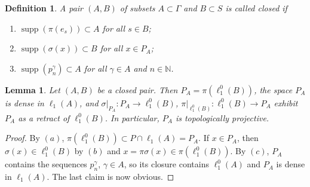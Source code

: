 \documentclass[12pt]{article}
\newtheorem{lemma}[theorem]{Lemma}
\newtheorem{definition}[theorem]{Definition}
\newcommand{\lo}[1]{\ell_1^0(#1)}
\newcommand{\ellone}[1]{\ell_1(#1)}
\newcommand{\supp}{\operatorname{supp}}
\begin{document}
\begin{definition}\label{ClosedPair} A pair $(A,B)$ of subsets $A\subset\Gamma$
    and $B\subset S$ is called closed if
    \begin{enumerate}[label = (\alph*)]
        \item $\supp(\pi(e_s))\subset A$ for all $s\in B$;
        \item $\supp(\sigma(x))\subset B$ for all $x\in P_A$;
        \item $\supp(p^\gamma_n)\subset A$ for all $\gamma\in A$ and
              $n\in\mathbb{N}$.
    \end{enumerate}
\end{definition}

\begin{lemma}\label{ClosedPairProps} Let $(A,B)$ be a closed pair. Then
    $P_A=\pi(\lo{B})$, the space $P_A$ is dense in $\ellone{A}$, and
    $\sigma|_{P_A}:P_A\to\lo{B}$, $\pi|_{\lo{B}}:\lo{B}\to P_A$ exhibit $P_A$ as
    a retract of $\lo{B}$. In particular, $P_A$ is topologically projective.
\end{lemma}
\begin{proof} By $(a)$, $\pi(\lo{B})\subset P\cap\ellone{A}=P_A$. If $x\in P_A$,
    then $\sigma(x)\in\lo{B}$ by $(b)$ and $x=\pi\sigma(x)\in\pi(\lo{B})$. By
    $(c)$, $P_A$ contains the sequences $p^\gamma_n$, $\gamma\in A$, so its
    closure contains $\lo{A}$ and $P_A$ is dense in $\ellone{A}$. The last
    claim is now obvious.
\end{proof}
\end{document}
